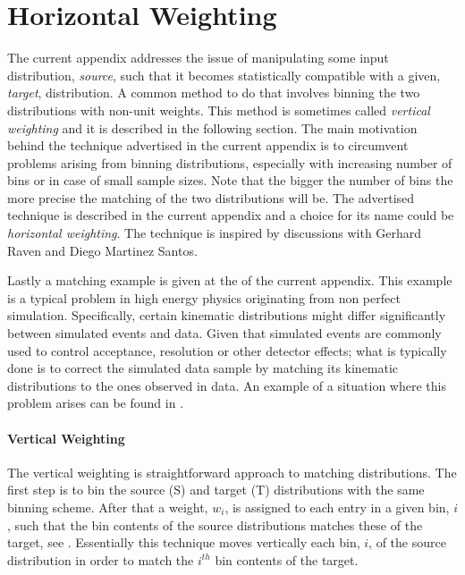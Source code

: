 
\chapter{Horizontal Weighting}
\label{AppendixB}

The current appendix addresses the issue of manipulating some input distribution, {\it source}, such that
it becomes statistically compatible with a given, {\it target}, distribution. A common method to do that
involves binning the two distributions with non-unit weights. This method is sometimes called {\it vertical weighting}
and it is described in the following section. The main motivation behind the technique advertised in the current
appendix is to circumvent problems arising from binning distributions, especially with increasing number of
bins or in case of small sample sizes. Note that the bigger the number of bins the more precise the matching
of the two distributions will be. The advertised technique is described in the current appendix and a choice for its name could be {\it horizontal weighting}.
The technique is inspired by discussions with Gerhard Raven and Diego Martinez Santos.

Lastly a matching example is given at the of the current appendix. This example is a typical problem
in high energy physics originating from non perfect simulation. Specifically, certain kinematic
distributions might differ significantly between simulated events and data. Given that simulated
events are commonly used to control acceptance, resolution or other detector effects; what is typically
done is to correct the simulated data sample by matching its kinematic distributions to the ones observed in data.
An example of a situation where this problem arises can be found in .

\subsubsection{Vertical Weighting}
The vertical weighting is straightforward approach to matching distributions.
The first step is to bin the source (S) and target (T) distributions with the same binning scheme.
After that a weight, $w_i$, is assigned to each entry in a given bin, $i$, such that the bin
contents of the source distributions matches these of the target, see .
Essentially this technique moves vertically each bin, $i$, of the source distribution in order to match
the $i^{th}$ bin contents of the target.

